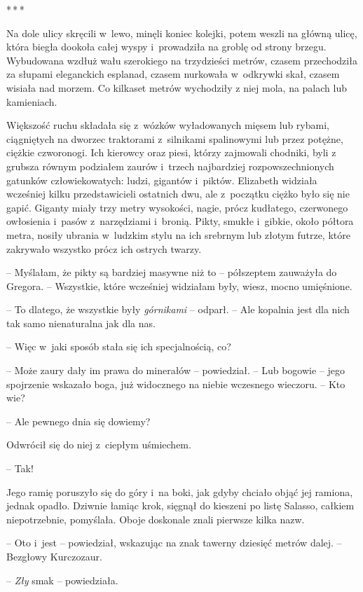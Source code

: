 \documentclass[oneside,polish,12pt,sfheadings]{mwbk}
\newcommand{\threeast}{\bigskip\par\centerline{*\,*\,*}\medskip\par}%
\begin{document}
\threeast

Na dole ulicy skręcili w~lewo, minęli koniec kolejki, potem weszli na
główną ulicę, która biegła dookoła całej wyspy i~prowadziła na groblę od
strony brzegu. Wybudowana wzdłuż wału szerokiego na trzydzieści metrów,
czasem przechodziła za słupami eleganckich esplanad, czasem nurkowała w~odkrywki skał, czasem wisiała nad morzem. Co kilkaset metrów wychodziły
z niej mola, na palach lub kamieniach.

Większość ruchu składała się z~wózków wyładowanych mięsem lub rybami,
ciągniętych na dworzec traktorami z~silnikami spalinowymi lub przez
potężne, ciężkie czworonogi. Ich kierowcy oraz piesi, którzy zajmowali
chodniki, byli z grubsza równym podziałem zaurów i~trzech najbardziej
rozpowszechnionych gatunków człowiekowatych: ludzi, gigantów i~piktów.
Elizabeth widziała wcześniej kilku przedstawicieli ostatnich dwu, ale z~początku ciężko było się nie gapić. Giganty miały trzy metry wysokości,
nagie, prócz kudłatego, czerwonego owłosienia i~pasów z~narzędziami i~bronią. Pikty, smukłe i~gibkie, około półtora metra, nosiły ubrania w~ludzkim stylu na ich srebrnym lub złotym futrze, które zakrywało
wszystko prócz ich ostrych twarzy.

-- Myślałam, że pikty są bardziej masywne niż to -- półszeptem zauważyła
do Gregora. -- Wszystkie, które wcześniej widziałam były, wiesz, mocno
umięśnione.

-- To dlatego, że wszystkie były \emph{górnikami } -- odparł. -- Ale
kopalnia jest dla nich tak samo nienaturalna jak dla nas.

-- Więc w~jaki sposób stała się ich specjalnością, co?

-- Może zaury dały im prawa do minerałów -- powiedział. -- Lub bogowie -- 
jego spojrzenie wskazało boga, już widocznego na niebie wczesnego
wieczoru. -- Kto wie?

-- Ale pewnego dnia się dowiemy?

Odwrócił się do niej z~ciepłym uśmiechem.

-- Tak!

Jego ramię poruszyło się do góry i~na boki, jak gdyby chciało objąć jej
ramiona, jednak opadło. Dziwnie łamiąc krok, sięgnął do kieszeni po
listę Salasso, całkiem niepotrzebnie, pomyślała. Oboje doskonale znali
pierwsze kilka nazw.

-- Oto i~jest -- powiedział, wskazując na znak tawerny dziesięć metrów
dalej. -- Bezgłowy Kurczozaur.

-- \emph{ Zły } smak -- powiedziała.
\end{document}
